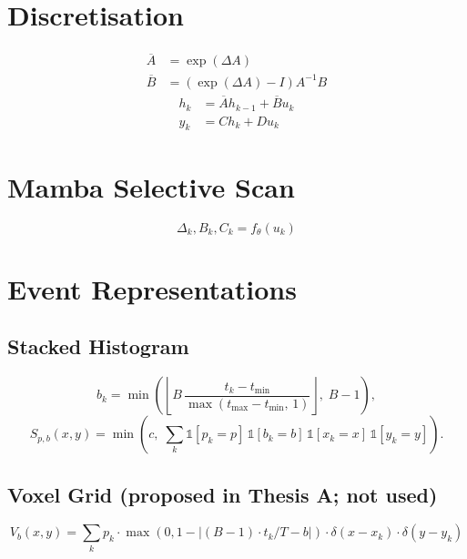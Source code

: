 \documentclass[11pt, a4paper]{report}
\begin{document}
\section{Discretisation}
\begin{align}
    \overline{A} &= \exp(\Delta A) \\
    \overline{B} &= (\exp(\Delta A) - I) A^{-1} B
\end{align}
\begin{align}
    h_k &= \overline{A} h_{k-1} + \overline{B} u_k \\
    y_k &= C h_k + D u_k
\end{align}

\section{Mamba Selective Scan}
\begin{equation}
    \Delta_k, B_k, C_k = f_\theta(u_k)
\end{equation}

\section{Event Representations}
\subsection{Stacked Histogram}
\label{subsec:stacked_hist}
\begin{equation}
  b_k = \min\!\left(\left\lfloor B\,\frac{t_k - t_{\min}}{\max(t_{\max}-t_{\min},\,1)}\right\rfloor,\; B-1\right),
  \label{eq:sh_bin}
\end{equation}
\begin{equation}
  S_{p,b}(x,y) = \min\!\left(c,\; \sum_k \mathbb{1}[p_k=p]\,\mathbb{1}[b_k=b]\,\mathbb{1}[x_k=x]\,\mathbb{1}[y_k=y]\right).
  \label{eq:sh_count}
\end{equation}

\subsection{Voxel Grid (proposed in Thesis A; not used)}
\begin{equation}
    V_b(x, y) = \sum_k p_k \cdot \max(0, 1 - |(B-1) \cdot t_k / T - b|) \cdot \delta(x-x_k) \cdot \delta(y-y_k)
\end{equation}
\end{document}
